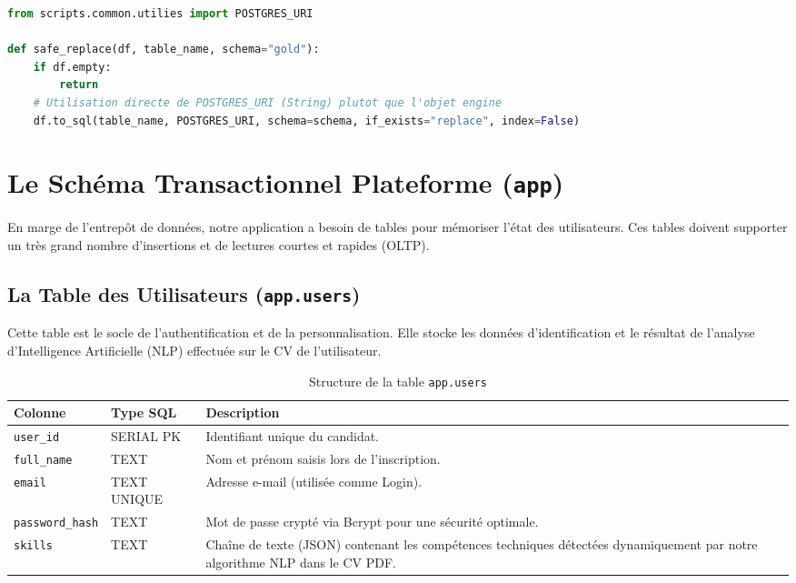 \documentclass[12pt,a4paper,twoside]{report}
\begin{document}
\begin{lstlisting}[language=Python, caption=Contournement du bug de compatibilité Pandas/SQLAlchemy]
from scripts.common.utilies import POSTGRES_URI

def safe_replace(df, table_name, schema="gold"):
    if df.empty:
        return
    # Utilisation directe de POSTGRES_URI (String) plutot que l'objet engine
    df.to_sql(table_name, POSTGRES_URI, schema=schema, if_exists="replace", index=False)
\end{lstlisting}

\section{Le Schéma Transactionnel Plateforme (\texttt{app})}
En marge de l'entrepôt de données, notre application a besoin de tables pour mémoriser l'état des utilisateurs. Ces tables doivent supporter un très grand nombre d'insertions et de lectures courtes et rapides (OLTP).

\subsection{La Table des Utilisateurs (\texttt{app.users})}
Cette table est le socle de l'authentification et de la personnalisation. Elle stocke les données d'identification et le résultat de l'analyse d'Intelligence Artificielle (NLP) effectuée sur le CV de l'utilisateur.

\begin{table}[H]
    \centering
    \begin{tabularx}{\textwidth}{|l|l|X|}
        \hline
        \textbf{Colonne} & \textbf{Type SQL} & \textbf{Description} \\
        \hline
        \texttt{user\_id} & SERIAL PK & Identifiant unique du candidat. \\
        \texttt{full\_name} & TEXT & Nom et prénom saisis lors de l'inscription. \\
        \texttt{email} & TEXT UNIQUE & Adresse e-mail (utilisée comme Login). \\
        \texttt{password\_hash}& TEXT & Mot de passe crypté via Bcrypt pour une sécurité optimale. \\
        \texttt{skills} & TEXT & Chaîne de texte (JSON) contenant les compétences techniques détectées dynamiquement par notre algorithme NLP dans le CV PDF. \\
        \hline
    \end{tabularx}
    \caption{Structure de la table \texttt{app.users}}
\end{table}
\end{document}
